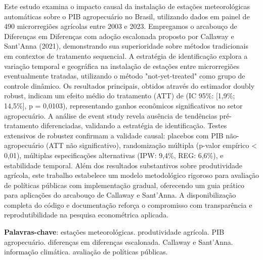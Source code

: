 \documentclass[
	12pt,				%
	oneside,			%
	a4paper,			%
	english,			%
	french,				%
	spanish,			%
	brazil				%
	]{abntex2}
\begin{document}
\setlength{\absparsep}{18pt} %
\begin{resumo}
Este estudo examina o impacto causal da instalação de estações meteorológicas automáticas sobre o PIB agropecuário no Brasil, utilizando dados em painel de 490 microrregiões agrícolas entre 2003 e 2023. Empregamos o arcabouço de Diferenças em Diferenças com adoção escalonada proposto por Callaway e Sant'Anna (2021), demonstrando sua superioridade sobre métodos tradicionais em contextos de tratamento sequencial. A estratégia de identificação explora a variação temporal e geográfica na instalação de estações entre microrregiões eventualmente tratadas, utilizando o método "not-yet-treated" como grupo de controle dinâmico. Os resultados principais, obtidos através do estimador doubly robust, indicam um efeito médio do tratamento (ATT) de \mainattpct{} (IC 95\%: [1,9\%; 14,5\%], p = 0,0103), representando ganhos econômicos significativos no setor agropecuário. A análise de event study revela ausência de tendências pré-tratamento diferenciadas, validando a estratégia de identificação. Testes extensivos de robustez confirmam a validade causal: placebos com PIB não-agropecuário (ATT não significativo), randomização múltipla (p-valor empírico < 0,01), múltiplas especificações alternativas (IPW: 9,4\%, REG: 6,6\%), e estabilidade temporal. Além dos resultados substantivos sobre produtividade agrícola, este trabalho estabelece um modelo metodológico rigoroso para avaliação de políticas públicas com implementação gradual, oferecendo um guia prático para aplicações do arcabouço de Callaway e Sant'Anna. A disponibilização completa do código e documentação reforça o compromisso com transparência e reprodutibilidade na pesquisa econométrica aplicada.

 \textbf{Palavras-chave}: estações meteorológicas. produtividade agrícola. PIB agropecuário. diferenças em diferenças escalonada. Callaway e Sant'Anna. informação climática. avaliação de políticas públicas.
\end{resumo}
\end{document}
